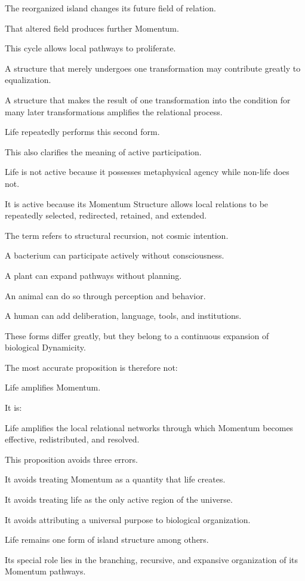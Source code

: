 The reorganized island changes its future field of relation.

That altered field produces further Momentum.

This cycle allows local pathways to proliferate.

A structure that merely undergoes one transformation may contribute greatly to equalization.

A structure that makes the result of one transformation into the condition for many later transformations amplifies the relational process.

Life repeatedly performs this second form.

This also clarifies the meaning of active participation.

Life is not active because it possesses metaphysical agency while non-life does not.

It is active because its Momentum Structure allows local relations to be repeatedly selected, redirected, retained, and extended.

The term refers to structural recursion, not cosmic intention.

A bacterium can participate actively without consciousness.

A plant can expand pathways without planning.

An animal can do so through perception and behavior.

A human can add deliberation, language, tools, and institutions.

These forms differ greatly, but they belong to a continuous expansion of biological Dynamicity.

The most accurate proposition is therefore not:

Life amplifies Momentum.

It is:

Life amplifies the local relational networks through which Momentum becomes effective, redistributed, and resolved.

This proposition avoids three errors.

It avoids treating Momentum as a quantity that life creates.

It avoids treating life as the only active region of the universe.

It avoids attributing a universal purpose to biological organization.

Life remains one form of island structure among others.

Its special role lies in the branching, recursive, and expansive organization of its Momentum pathways.

